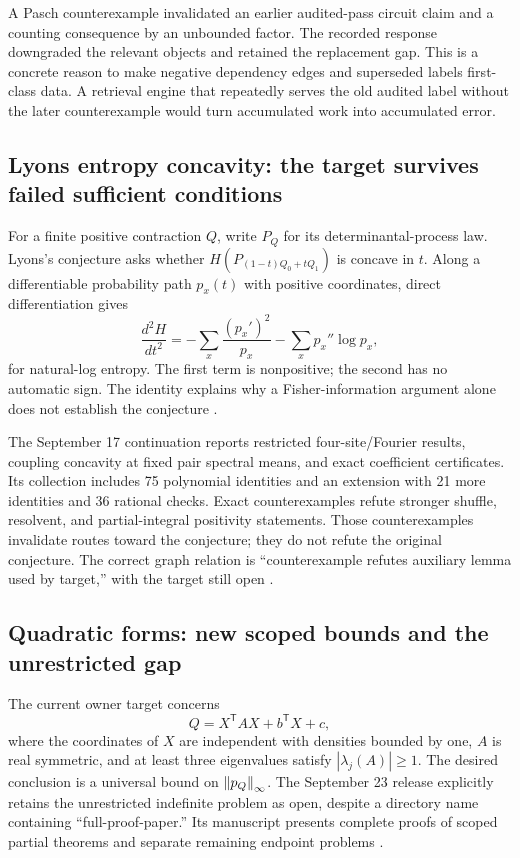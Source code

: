 A Pasch counterexample invalidated an earlier audited-pass circuit claim and a counting consequence by an unbounded factor. The recorded response downgraded the relevant objects and retained the replacement gap. This is a concrete reason to make negative dependency edges and superseded labels first-class data. A retrieval engine that repeatedly serves the old audited label without the later counterexample would turn accumulated work into accumulated error.

\subsection{Lyons entropy concavity: the target survives failed sufficient conditions}

For a finite positive contraction $Q$, write $P_Q$ for its determinantal-process law. Lyons's conjecture asks whether $H(P_{(1-t)Q_0+tQ_1})$ is concave in $t$. Along a differentiable probability path $p_x(t)$ with positive coordinates, direct differentiation gives
\[
\frac{d^2H}{dt^2}
=-\sum_x\frac{(p_x')^2}{p_x}
-\sum_xp_x''\log p_x,
\]
for natural-log entropy. The first term is nonpositive; the second has no automatic sign. The identity explains why a Fisher-information argument alone does not establish the conjecture \citep{Lyons2003,Lyons2014,CaseLyons2026}.

The September 17 continuation reports restricted four-site/Fourier results, coupling concavity at fixed pair spectral means, and exact coefficient certificates. Its collection includes 75 polynomial identities and an extension with 21 more identities and 36 rational checks. Exact counterexamples refute stronger shuffle, resolvent, and partial-integral positivity statements. Those counterexamples invalidate routes toward the conjecture; they do not refute the original conjecture. The correct graph relation is ``counterexample refutes auxiliary lemma used by target,'' with the target still open \citep{CaseLyons2026}.

\subsection{Quadratic forms: new scoped bounds and the unrestricted gap}

The current owner target concerns
\[
Q=X^\mathsf{T}AX+b^\mathsf{T}X+c,
\]
where the coordinates of $X$ are independent with densities bounded by one, $A$ is real symmetric, and at least three eigenvalues satisfy $|\lambda_j(A)|\geq1$. The desired conclusion is a universal bound on $\left\lVert p_Q\right\rVert_\infty$. The September 23 release explicitly retains the unrestricted indefinite problem as open, despite a directory name containing ``full-proof-paper.'' Its manuscript presents complete proofs of scoped partial theorems and separate remaining endpoint problems \citep{CaseQFORMRelease2026,CaseQFORMScope2026}.

